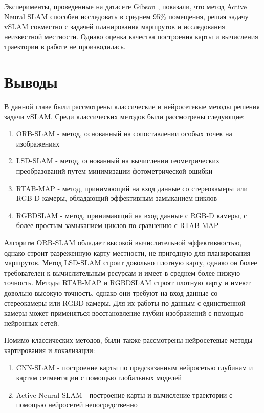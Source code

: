 \documentclass{mipt-thesis-ms}
\begin{document}
	Эксперименты, проведенные на датасете Gibson \cite{xia2018gibson}, показали, что метод Active Neural SLAM способен исследовать в среднем 95\% помещения, решая задачу vSLAM совместно с задачей планирования маршрутов и исследования неизвестной местности. Однако оценка качества построения карты и вычисления траектории в работе \cite{chaplot2020learning} не производилась.
	
	\section{Выводы}
	
	В данной главе были рассмотрены классические и нейросетевые методы решения задачи vSLAM. Среди классических методов были рассмотрены следующие:
	
	\begin{enumerate}
		\item ORB-SLAM - метод, основанный на сопоставлении особых точек на изображениях
		\item LSD-SLAM - метод, основанный на вычислении геометрических преобразований путем минимизации фотометрической ошибки
		\item RTAB-MAP - метод, принимающий на вход данные со стереокамеры или RGB-D камеры, обладающий эффективным замыканием циклов
		\item RGBDSLAM - метод, принимающий на вход данные с RGB-D камеры, с более простым замыканием циклов по сравнению с RTAB-MAP
	\end{enumerate}

	Алгоритм ORB-SLAM обладает высокой вычислительной эффективностью, однако строит разреженную карту местности, не пригодную для планирования маршрутов. Метод LSD-SLAM строит довольно плотную карту, однако он более требователен к вычислительным ресурсам и имеет в среднем более низкую точность. Методы RTAB-MAP и RGBDSLAM строят плотную карту и имеют довольно высокую точность, однако они требуют на вход данные со стереокамеры или RGBD-камеры. Для их работы по данным с единственной камеры может применяться восстановление глубин изображений с помощью нейронных сетей.
	
	Помимо классических методов, были также рассмотрены нейросетевые методы картирования и локализации:
	
	\begin{enumerate}
		\item CNN-SLAM - построение карты по предсказанным нейросетью глубинам и картам сегментации с помощью глобальных моделей
		\item Active Neural SLAM - построение карты и вычисление траектории с помощью нейросетей непосредственно
	\end{enumerate}
\end{document}
